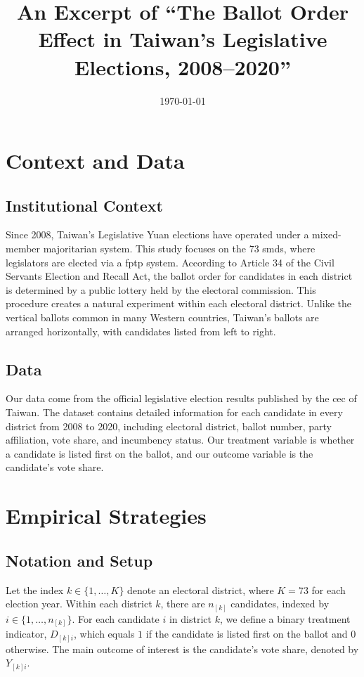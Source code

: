 \documentclass[10pt]{article}
\title{An Excerpt of ``The Ballot Order Effect in Taiwan's Legislative Elections, 2008--2020''}
\date{\today}
\theoremstyle{sfstyle}
\theoremstyle{remark}
\begin{document}
\maketitle

\setcounter{section}{1}

\section{Context and Data} \label{sec:context-data}

\subsection{Institutional Context}

Since 2008, 
Taiwan's Legislative Yuan elections 
have operated under a mixed-member majoritarian system. 
This study focuses on the 73 \glspl{smd},
where legislators are elected via a \gls{fptp} system. 
According to Article 34 of the Civil Servants Election and Recall Act, 
the ballot order for candidates in each district 
is determined by a public lottery held by the electoral commission.
This procedure creates a natural experiment within each electoral district. 
Unlike the vertical ballots common in many Western countries, 
Taiwan's ballots are arranged horizontally, 
with candidates listed from left to right.

\subsection{Data}

Our data come from the official legislative election results
published by the \gls{cec} of Taiwan.
The dataset contains detailed information
for each candidate in every district from 2008 to 2020,
including electoral district,
ballot number, party affiliation, 
vote share, and incumbency status.
Our treatment variable is whether a candidate is listed first on the ballot,
and our outcome variable is the candidate's vote share.

\section{Empirical Strategies}

\subsection{Notation and Setup}

Let the index $k \in \{1, \ldots, K\}$ denote an electoral district, 
where $K=73$ for each election year. 
Within each district $k$, 
there are $n_{[k]}$ candidates,
indexed by $i \in \{1, \ldots, n_{[k]}\}$. 
For each candidate $i$ in district $k$, 
we define a binary treatment indicator, $D_{[k]i}$, 
which equals $1$ if the candidate is listed first on the ballot 
and $0$ otherwise. 
The main outcome of interest is the candidate's vote share, 
denoted by $Y_{[k]i}$.
\end{document}
